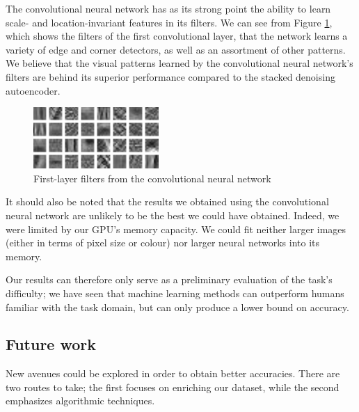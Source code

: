 \documentclass{acm_proc_article-sp}
\begin{document}
The convolutional neural network has as its strong point the ability to learn scale- and location-invariant features in its filters. We can see from Figure \ref{fig:convnet_filters}, which shows the filters of the first convolutional layer, that the network learns a variety of edge and corner detectors, as well as an assortment of other patterns. We believe that the visual patterns learned by the convolutional neural network's filters are behind its superior performance  compared to the stacked denoising autoencoder.

\begin{figure}[h!]
\includegraphics[width=\linewidth]{convnet_filters.pdf}
		\caption{First-layer filters from the convolutional neural network}
		\label{fig:convnet_filters}
\end{figure}

It should also be noted that the results we obtained using the convolutional neural network are unlikely to be the best we could have obtained. Indeed, we were limited by our GPU's memory capacity. We could fit neither larger images (either in terms of pixel size or colour) nor larger neural networks into its memory.

Our results can therefore only serve as a preliminary evaluation of the task's difficulty; we have seen that machine learning methods can outperform humans familiar with the task domain, but can only produce a lower bound on accuracy.

\subsection{Future work}
New avenues could be explored in order to obtain better accuracies. There are two routes to take; the first focuses on enriching our dataset, while the second emphasizes algorithmic techniques. 
\end{document}
